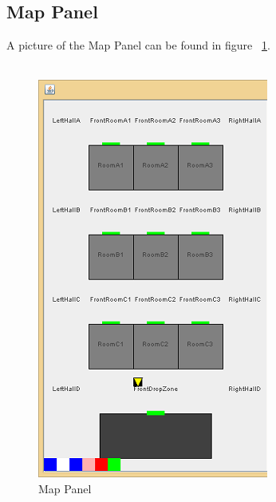 \subsection{Map Panel}
A picture of the Map Panel can be found in figure ~\ref{fig:mapPanel}. \\\\
\begin{figure}[h]
\begin{center}
\includegraphics{NewFeatures/hpg-left.png}
\end{center}
\caption{Map Panel}
\label{fig:mapPanel}
\end{figure}

